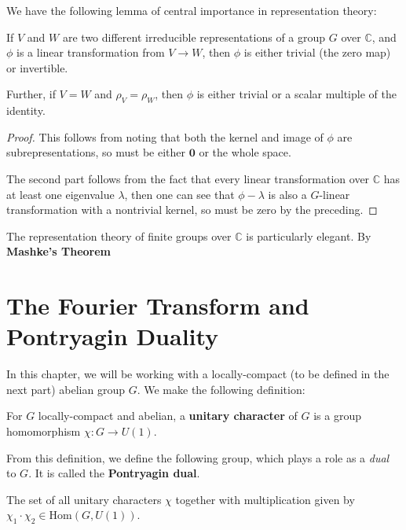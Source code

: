 		We have the following lemma of central importance in representation theory: 
		\begin{lemma}
			If $V$ and $W$ are two different irreducible representations of a group $G$ over $\mathbb C$, and $\phi$ is a linear transformation from $V \to W$, then $\phi$ is either trivial (the zero map) or invertible.
			
			Further, if $V=W$ and $\rho_V=\rho_W$, then $\phi$ is either trivial or a scalar multiple of the identity. 
		\end{lemma}
		\begin{proof}
			This follows from noting that both the kernel and image of $\phi$ are subrepresentations, so must be either $\mathbf 0$ or the whole space. 
			
			The second part follows from the fact that every linear transformation over $\mathbb C$ has at least one eigenvalue $\lambda$, then one can see that $\phi - \lambda$ is also a $G$-linear transformation with a nontrivial kernel, so must be zero by the preceding.
		\end{proof}

		The representation theory of finite groups over $\mathbb C$ is particularly elegant. By \textbf{Mashke's Theorem}

		
		\section{The Fourier Transform and Pontryagin Duality} %
		\label{sec:the_fourier_transform_and_pontryagin_duality}
		
		In this chapter, we will be working with a locally-compact (to be defined in the next part) abelian group $G$. We make the following definition:
		\begin{defn}
			For $G$ locally-compact and abelian, a \textbf{unitary character} of $G$ is a group homomorphism $\chi: G \to U(1)$.
		\end{defn}
		From this definition, we define the following group, which plays a role as a \emph{dual} to $G$. It is called the \textbf{Pontryagin dual}.
		\begin{defn}
			The set of all unitary characters $\chi$ together with multiplication given by $\chi_1 \cdot \chi_2 \in \mathrm{Hom}(G, U(1))$.
		\end{defn}
		
